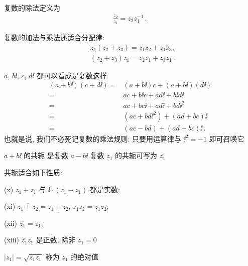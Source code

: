 \begin{definition}
    复数的除法定义为
    \begin{align*}
        \frac{z_2}{z_1} = z_2 z_1^{-1} \period
    \end{align*}
\end{definition}

\begin{proposition}
    复数的加法与乘法还适合分配律:
    \begin{align*}
         & z_1 (z_2 + z_3) = z_1 z_2 + z_1 z_3,       \\
         & (z_2 + z_3) z_1 = z_2 z_1 + z_3 z_1\period
    \end{align*}
\end{proposition}

\begin{remark}
    $a$, $b\ii$, $c$, $d\ii$ 都可以看成是复数\period 这样
    \begin{align*}
        (a + b \ii) (c + d \ii)
        = {} & (a + b \ii) c + (a + b \ii) (d \ii)  \\
        = {} & ac + b \ii c + a d \ii + b \ii d \ii \\
        = {} & ac + bc\ii + ad\ii + bd\ii^2         \\
        = {} & (ac + bd\ii^2) + (ad + bc)\ii        \\
        = {} & (ac - bd) + (ad + bc)\ii \period
    \end{align*}
    也就是说, 我们不必死记复数的乘法规则: 只要用运算律与 $\ii^2 = -1$ 即可召唤它\period
\end{remark}

\begin{definition}
    $a + b\ii$ 的共轭  是复数 $a - b\ii$ \period 复数 $z_1$ 的共轭可写为 $\overline{z_1}$\period
\end{definition}

\begin{proposition}
    共轭适合如下性质:

    (x) $\overline{z_1} + z_1$ 与 $\ii \cdot (\overline{z_1} - z_1)$ 都是实数;

    (xi) $\overline{z_1 + z_2} = \overline{z_1} + \overline{z_2}$, $\overline{z_1 z_2} = \overline{z_1} \overline{z_2}$;

    (xii) $\overline{\overline{z_1}} = z_1$;

    (xiii) $\overline{z_1} z_1$ 是正数, 除非 $z_1 = 0$\period
\end{proposition}

\begin{definition}
    $|z_1| = \sqrt{\overline{z_1} z_1}$ 称为 $z_1$ 的绝对值 \period
\end{definition}

